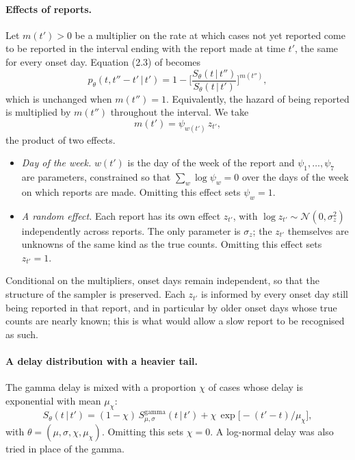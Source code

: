 \documentclass[11pt,a4paper]{article}
\newcommand{\given}{\,|\,}
\begin{document}
\paragraph{Effects of reports.} Let $m(t')>0$ be a multiplier on the rate at
which cases not yet reported come to be reported in the interval ending with
the report made at time $t'$, the same for every onset day. Equation (2.3) of
\cite{bajaj2025} becomes
\begin{equation}\label{eq:pmultiplier}
p_\theta(t, t''-t'\given t') = 1-\Biggl[\frac{S_\theta(t\given t'')}{S_\theta(t\given t')}\Biggr]^{m(t'')},
\end{equation}
which is unchanged when $m(t'')=1$. Equivalently, the hazard of being reported
is multiplied by $m(t'')$ throughout the interval. We take
\begin{equation}\label{eq:multiplier}
m(t') = \psi_{w(t')}\,z_{t'},
\end{equation}
the product of two effects.
\begin{itemize}[itemsep=2pt]
\item \emph{Day of the week.} $w(t')$ is the day of the week of the report and
$\psi_1,\dots,\psi_7$ are parameters, constrained so that
$\sum_w\log\psi_w=0$ over the days of the week on which reports are made.
Omitting this effect sets $\psi_w=1$.
\item \emph{A random effect.} Each report has its own effect $z_{t'}$, with
$\log z_{t'}\sim\mathcal{N}(0,\sigma_z^2)$ independently across reports. The
only parameter is $\sigma_z$; the $z_{t'}$ themselves are unknowns of the same
kind as the true counts. Omitting this effect sets $z_{t'}=1$.
\end{itemize}
Conditional on the multipliers, onset days remain independent, so that the
structure of the sampler is preserved. Each $z_{t'}$ is informed by every onset
day still being reported in that report, and in particular by older onset days
whose true counts are nearly known; this is what would allow a slow report to
be recognised as such.

\paragraph{A delay distribution with a heavier tail.} The gamma delay is mixed
with a proportion $\chi$ of cases whose delay is exponential with mean
$\mu_\chi$:
\begin{equation}\label{eq:tail}
S_\theta(t\given t') = (1-\chi)\,S^{\mathrm{gamma}}_{\mu,\sigma}(t\given t')
+ \chi\,\exp\bigl[-(t'-t)/\mu_\chi\bigr],
\end{equation}
with $\theta=(\mu,\sigma,\chi,\mu_\chi)$. Omitting this sets $\chi=0$. A
log-normal delay was also tried in place of the gamma.
\end{document}
